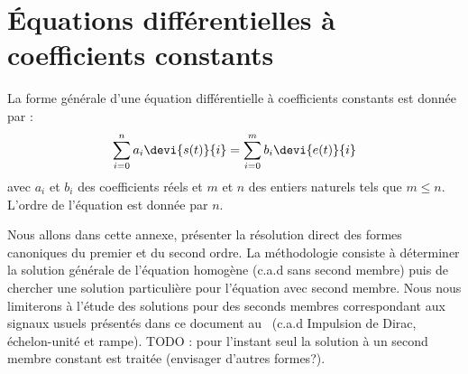 \chapter{Équations différentielles à coefficients 
         constants\label{annexe-eqndiff}}
La forme générale d'une équation différentielle à coefficients constants est 
donnée par :
\begin{align}
\sum_{i=0}^{n}a_i\devi{s(t)}{i}=\sum_{i=0}^{m}b_i\devi{e(t)}{i}
\end{align}
avec $a_i$ et $b_i$ des coefficients réels et $m$ et $n$ des entiers naturels 
tels que $m\le n$. L'ordre de l'équation est donnée par $n$.

Nous allons dans cette annexe, présenter la résolution direct 
des formes canoniques du premier et du second ordre. La méthodologie consiste
à déterminer la solution générale de l'équation homogène (c.a.d sans second 
membre) puis de chercher une solution particulière pour l'équation avec second 
membre. Nous nous limiterons à l'étude des solutions pour des seconds membres 
correspondant aux signaux usuels présentés dans ce document 
au~ (c.a.d Impulsion de Dirac, échelon-unité et rampe).
TODO : pour l'instant seul la solution à un second membre constant est traitée 
(envisager d'autres formes?).

